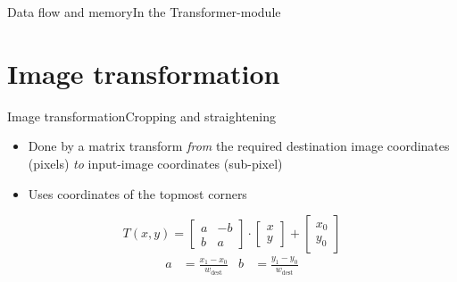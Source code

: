 \documentclass[10pt]{beamer}
\begin{document}
\begin{frame}{Data flow and memory}{In the Transformer-module}
\end{frame}

\section{Image transformation}

\begin{frame}{Image transformation}{Cropping and straightening}
\begin{itemize}
    \item Done by a matrix transform \emph{from} the required destination image coordinates (pixels) \emph{to} input-image coordinates (sub-pixel)
    \item Uses coordinates of the topmost corners
\end{itemize}
\pause

    \begin{equation*}    
        T(x,y) = \begin{bmatrix}
                a&-b \\
                b&a
            \end{bmatrix} \cdot 
            \begin{bmatrix}x\\y\end{bmatrix}
                + \begin{bmatrix}x_0\\y_0\end{bmatrix}
    \end{equation*}
    \begin{align*}
        a &= \frac{x_1 - x_0}{w_\text{dest}} &
        b &= \frac{y_1 - y_0}{w_\text{dest}}
    \end{align*}
\end{frame}
\end{document}
